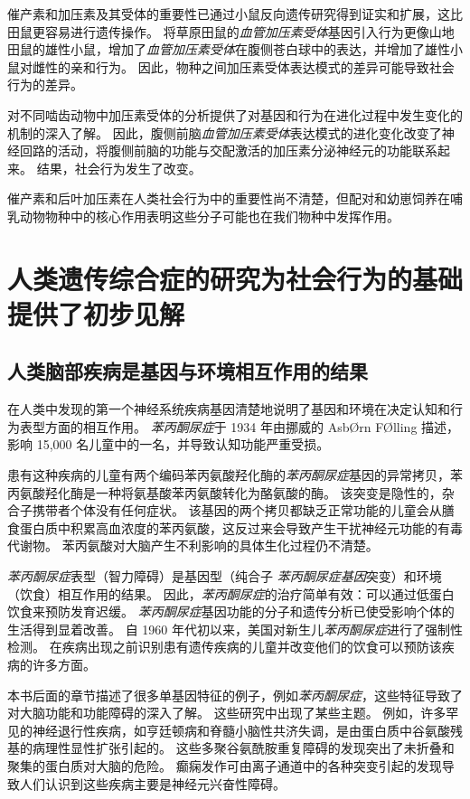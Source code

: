 催产素和加压素及其受体的重要性已通过小鼠反向遗传研究得到证实和扩展，这比田鼠更容易进行遗传操作。
将草原田鼠的\textit{血管加压素受体}基因引入行为更像山地田鼠的雄性小鼠，增加了\textit{血管加压素受体}在腹侧苍白球中的表达，并增加了雄性小鼠对雌性的亲和行为。
因此，物种之间加压素受体表达模式的差异可能导致社会行为的差异。


对不同啮齿动物中加压素受体的分析提供了对基因和行为在进化过程中发生变化的机制的深入了解。
因此，腹侧前脑\textit{血管加压素受体}表达模式的进化变化改变了神经回路的活动，将腹侧前脑的功能与交配激活的加压素分泌神经元的功能联系起来。
结果，社会行为发生了改变。


催产素和后叶加压素在人类社会行为中的重要性尚不清楚，但配对和幼崽饲养在哺乳动物物种中的核心作用表明这些分子可能也在我们物种中发挥作用。



\section{人类遗传综合症的研究为社会行为的基础提供了初步见解}

\subsection{人类脑部疾病是基因与环境相互作用的结果}

在人类中发现的第一个神经系统疾病基因清楚地说明了基因和环境在决定认知和行为表型方面的相互作用。
\textit{苯丙酮尿症}于 1934 年由挪威的 AsbØrn FØlling 描述，影响 15,000 名儿童中的一名，并导致认知功能严重受损。


患有这种疾病的儿童有两个编码苯丙氨酸羟化酶的\textit{苯丙酮尿症}基因的异常拷贝，苯丙氨酸羟化酶是一种将氨基酸苯丙氨酸转化为酪氨酸的酶。
该突变是隐性的，杂合子携带者个体没有任何症状。
该基因的两个拷贝都缺乏正常功能的儿童会从膳食蛋白质中积累高血浓度的苯丙氨酸，这反过来会导致产生干扰神经元功能的有毒代谢物。
苯丙氨酸对大脑产生不利影响的具体生化过程仍不清楚。


\textit{苯丙酮尿症}表型（智力障碍）是基因型（纯合子 \textit{苯丙酮尿症基因}突变）和环境（饮食）相互作用的结果。
因此，\textit{苯丙酮尿症}的治疗简单有效：可以通过低蛋白饮食来预防发育迟缓。
\textit{苯丙酮尿症}基因功能的分子和遗传分析已使受影响个体的生活得到显着改善。
自 1960 年代初以来，美国对新生儿\textit{苯丙酮尿症}进行了强制性检测。
在疾病出现之前识别患有遗传疾病的儿童并改变他们的饮食可以预防该疾病的许多方面。


本书后面的章节描述了很多单基因特征的例子，例如\textit{苯丙酮尿症}，这些特征导致了对大脑功能和功能障碍的深入了解。
这些研究中出现了某些主题。
例如，许多罕见的神经退行性疾病，如亨廷顿病和脊髓小脑性共济失调，是由蛋白质中谷氨酸残基的病理性显性扩张引起的。
这些多聚谷氨酰胺重复障碍的发现突出了未折叠和聚集的蛋白质对大脑的危险。
癫痫发作可由离子通道中的各种突变引起的发现导致人们认识到这些疾病主要是神经元兴奋性障碍。



